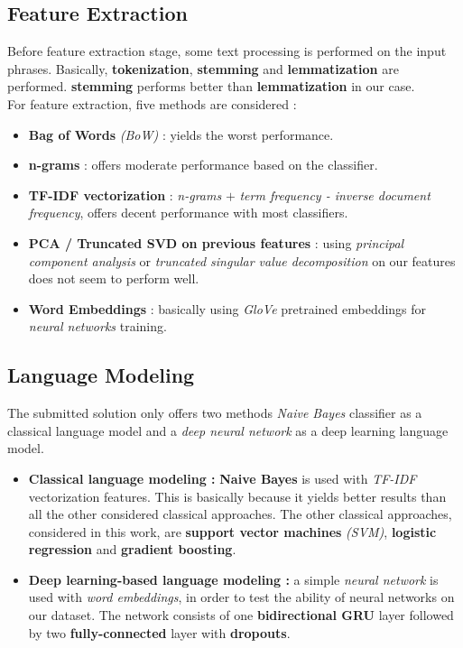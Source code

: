 \documentclass[letterpaper, 10 pt, conference]{ieeeconf}  %
\begin{document}
\subsection{Feature Extraction}
Before feature extraction stage, some text processing is performed on the input phrases. Basically, \textbf{tokenization}, \textbf{stemming} and \textbf{lemmatization} are performed. \textbf{stemming} performs better than \textbf{lemmatization} in our case. \\
For feature extraction, five methods are considered :
\begin{itemize}
    \item \textbf{Bag of Words} \emph{(BoW)} : yields the worst performance.
    \item \textbf{n-grams} : offers moderate performance based on the classifier.
    \item \textbf{TF-IDF vectorization} : \emph{n-grams} $+$ \emph{term frequency - inverse document frequency}, offers decent performance with most classifiers.
    \item \textbf{PCA / Truncated SVD on previous features} : using \emph{principal component analysis} or \emph{truncated singular value decomposition} on our features does not seem to perform well.
    \item \textbf{Word Embeddings} : basically using \emph{GloVe} pretrained embeddings for \emph{neural networks} training.
\end{itemize}

\subsection{Language Modeling}
The submitted solution only offers two methods \emph{Naive Bayes} classifier as a classical language model and a \emph{deep neural network} as a deep learning language model.
\begin{itemize}
    \item \textbf{Classical language modeling :} \textbf{Naive Bayes} is used with \emph{TF-IDF} vectorization features. This is basically because it yields better results than all the other considered classical approaches. The other classical approaches, considered in this work, are \textbf{support vector machines} \emph{(SVM)}, \textbf{logistic regression} and \textbf{gradient boosting}.
    \item \textbf{Deep learning-based language modeling :} a simple \emph{neural network} is used with \emph{word embeddings}, in order to test the ability of neural networks on our dataset. The network consists of one \textbf{bidirectional GRU} layer followed by two \textbf{fully-connected} layer with \textbf{dropouts}. 
\end{itemize}
\end{document}
